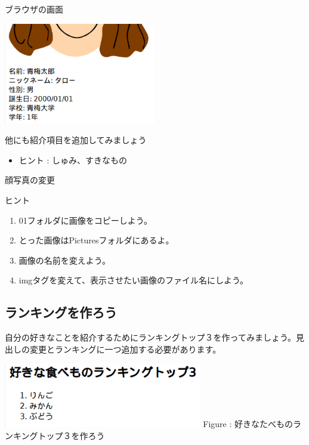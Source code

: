 \documentclass[a4paper,12pt]{jarticle}
\begin{document}
\bigskip

\bigskip



ブラウザの画面

\includegraphics[width=0.5\textwidth]{textbook-img173.png}



\clearpage
{}\theQuestion\label{Q:hasAnswer04-4}

他にも紹介項目を追加してみましょう

\begin{itemize}
  \item ヒント : しゅみ、すきなもの
\end{itemize}
\theQuestion\label{Q:hasAnswer04-5}

顔写真の変更

ヒント

\begin{enumerate}
  \item
        01フォルダに画像をコピーしよう。
  \item とった画像はPicturesフォルダにあるよ。
  \item 画像の名前を変えよう。
  \item
        imgタグを変えて、表示させたい画像のファイル名にしよう。
\end{enumerate}

\bigskip


\bigskip

\clearpage
{}
\subsection{\theExercise ランキングを作ろう}
自分の好きなことを紹介するためにランキングトップ３を作ってみましょう。見出しの変更とランキングに一つ追加する必要があります。



\bigskip


\begin{minipage}{\textwidth}
  {\upshape
    \includegraphics[width=0.65\textwidth]{textbook-img178.png}
    \newline
    Figure :
    好きなたべものランキングトップ３を作ろう}
\end{minipage}
\end{document}
